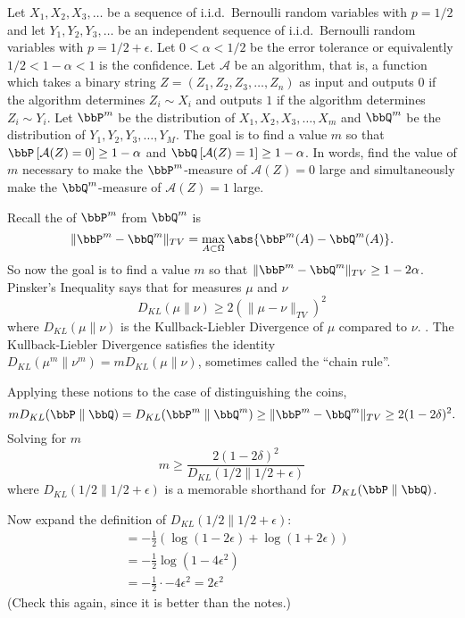 \documentclass[12pt]{article}
\begin{document}
Let \( X_1, X_2, X_3, \ldots \) be a sequence of i.i.d.\ Bernoulli
random variables with \( p = 1/2 \) and let \( Y_1, Y_2, Y_3, \ldots \)
be an independent sequence of i.i.d.\ Bernoulli random variables with \(
p = 1/2 + \epsilon \). Let \( 0 < \alpha < 1/2 \) be the error tolerance
or equivalently \( 1/2 < 1- \alpha < 1 \) is the confidence.  Let \(
\mathcal{A} \) be an algorithm, that is, a function which takes a binary
string \( Z = (Z_1, Z_2, Z_3, \ldots, Z_n) \) as input and outputs \( 0 \)
if the algorithm determines \( Z_i \sim X_i \) and outputs \( 1 \) if
the algorithm determines \( Z_i \sim Y_i \).  Let \( \bbP^m \) be the
distribution of \( X_1, X_2, X_3, \ldots, X_m \) and \( \bbQ^{m} \) be
the distribution of \( Y_1, Y_2, Y_3, \ldots, Y_M \).  The goal is to
find a value \( m \) so that \( \bbP
\left[ \mathcal{A}(Z)  = 0 \right] \ge 1-\alpha \) and \( \bbQ
\left[ \mathcal{A}(Z) = 1 \right] \ge 1-\alpha \).  In words, find the
value of \( m \) necessary to make the \( \bbP^m \)-measure of \(
\mathcal{A}(Z) = 0 \) large and simultaneously make the \( \bbQ^m \)-measure
of \( \mathcal{A}(Z) = 1 \) large.

Recall the  of \( \bbP^m \) from \( \bbQ^
{m} \) is%
\[
    \| \bbP^m - \bbQ^m \|_{TV} = \max_{A \subset \Omega} \abs{ \bbP^m(A)
    - \bbQ^m(A)}.
\] So now the goal is to find a value \( m \) so that \( \| \bbP^m -
\bbQ^m \|_{TV} \ge 1 - 2\alpha \). Pinsker's Inequality says that for
measures \( \mu \) and \( \nu \)%
\[
    D_{KL}(\mu \parallel \nu) \ge 2 \left( \| \mu - \nu \|_{TV} \right)^2
\] where \( D_{KL}(\mu \parallel \nu) \) is the Kullback-Liebler
Divergence of \( \mu \) compared to \( \nu \).%
%
.  The Kullback-Liebler Divergence satisfies the identity \( D_{KL}(\mu^m
\parallel\nu^m) = m D_{KL}(\mu \parallel\nu) \), sometimes called the
``chain rule''.

Applying these notions to the case of distinguishing the coins,
\[
    m D_{KL}(\bbP \parallel \bbQ) = D_{KL}(\bbP^m \parallel \bbQ^m) \ge
    \| \bbP^m - \bbQ^m \|_{TV} \ge 2 (1 - 2\delta)^2.
\] Solving for \( m \)
\[
    m \ge \frac{2 (1 - 2\delta)^2}{D_{KL}(1/2 \parallel 1/2 + \epsilon)}
\] where \( D_{KL}(1/2 \parallel 1/2 + \epsilon) \) is a memorable
shorthand for \( D_{KL}(\bbP \parallel \bbQ) \).

Now expand the definition of \( D_{KL}(1/2 \parallel 1/2 + \epsilon) \):
\begin{align*}
    &= -\frac{1}{2} \left( \log \left( 1-2\epsilon \right) + \log \left(
    1+2\epsilon \right) \right) \\
    &= -\frac{1}{2} \log( 1- 4\epsilon^2 ) \\
    &= -\frac{1}{2} \cdot -4 \epsilon^2 = 2 \epsilon^{2}
\end{align*}
(Check this again, since it is better than the notes.)
\end{document}
